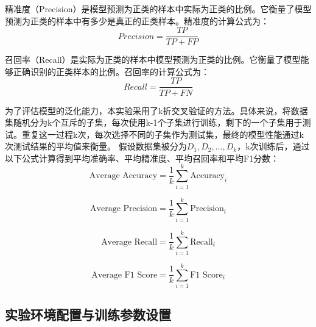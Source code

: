 精准度（Precision）是模型预测为正类的样本中实际为正类的比例。它衡量了模型预测为正类的样本中有多少是真正的正类样本。精准度的计算公式为：
\begin{equation}
    \label{eq:precision}
    Precision = \frac{TP}{TP + FP}
\end{equation}

召回率（Recall）是实际为正类的样本中模型预测为正类的比例。它衡量了模型能够正确识别的正类样本的比例。召回率的计算公式为：
\begin{equation}
    \label{eq:recall}
    Recall = \frac{TP}{TP + FN}
\end{equation} 

为了评估模型的泛化能力，本实验采用了k折交叉验证的方法。具体来说，将数据集随机分为k个互斥的子集，每次使用k-1个子集进行训练，剩下的一个子集用于测试。重复这一过程k次，每次选择不同的子集作为测试集，最终的模型性能通过k次测试结果的平均值来衡量。
假设数据集被分为$D_1, D_2, \ldots, D_k$，k次训练后，通过以下公式计算得到平均准确率、平均精准度、平均召回率和平均F1分数：
\begin{equation}
    \text{Average Accuracy} = \frac{1}{k} \sum_{i=1}^{k} \text{Accuracy}_i
\end{equation}

\begin{equation}
    \text{Average Precision} = \frac{1}{k} \sum_{i=1}^{k} \text{Precision}_i
\end{equation}

\begin{equation}
    \text{Average Recall} = \frac{1}{k} \sum_{i=1}^{k} \text{Recall}_i
\end{equation}

\begin{equation}
    \text{Average F1 Score} = \frac{1}{k} \sum_{i=1}^{k} \text{F1 Score}_i
\end{equation}


\subsection{实验环境配置与训练参数设置}

